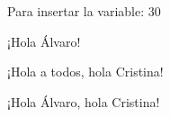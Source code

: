 \documentclass{article}
\begin{document}

\newcommand{\x}{30}

Para insertar la variable: {\x}



\newcommand{\saludar}[1] {  %
    ¡Hola #1!
}

\saludar{Álvaro} %


\newcommand{\saludarPorDefecto}[2][Álvaro] { %
    ¡Hola #1, hola #2!
}


\saludarPorDefecto[a todos]{Cristina}  %

\saludarPorDefecto{Cristina}           %

\end{document}
